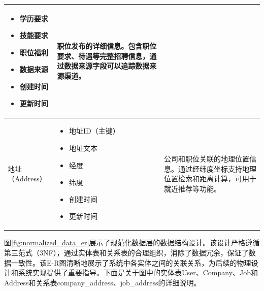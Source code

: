 \begin{table}[htbp]
\begin{tabular}{|p{}|p{}|p{}|}
\begin{itemize}
      \item 学历要求
      \item 技能要求
      \item 职位福利
      \item 数据来源
      \item 创建时间
      \item 更新时间
    \end{itemize} & 
    \begin{center}职位发布的详细信息。包含职位要求、待遇等完整招聘信息，通过数据来源字段可以追踪数据来源渠道。\end{center} \\
    \hline
    \multirow{6}{*}{地址（Address）} & 
    \begin{itemize}
      \item 地址ID（主键）
      \item 地址文本
      \item 经度
      \item 纬度
      \item 创建时间
      \item 更新时间
    \end{itemize} & 
    \begin{center}公司和职位关联的地理位置信息。通过经纬度坐标支持地理位置检索和距离计算，可用于就近推荐等功能。\end{center} \\
    \hline
  \end{tabular}
\end{table}

图\ref{fig:normalized_data_er}展示了规范化数据层的数据结构设计。该设计严格遵循第三范式（3NF），通过实体表和关系表的合理组织，消除了数据冗余，保证了数据一致性。该E-R图清晰地展示了系统中各实体之间的关联关系，为后续的物理设计和系统实现提供了重要指导。下面是关于图中的实体表User、Company、Job和Address和关系表company\_address、job\_address的详细说明。

